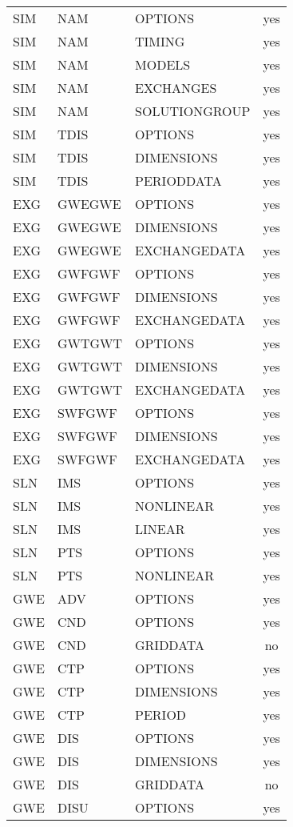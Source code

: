 \begin{longtable}{p{1.5cm} p{1.5cm} p{3cm} c}
\hline
SIM & NAM & OPTIONS & yes \\ 
SIM & NAM & TIMING & yes \\ 
SIM & NAM & MODELS & yes \\ 
SIM & NAM & EXCHANGES & yes \\ 
SIM & NAM & SOLUTIONGROUP & yes \\ 
\hline
SIM & TDIS & OPTIONS & yes \\ 
SIM & TDIS & DIMENSIONS & yes \\ 
SIM & TDIS & PERIODDATA & yes \\ 
\hline
EXG & GWEGWE & OPTIONS & yes \\ 
EXG & GWEGWE & DIMENSIONS & yes \\ 
EXG & GWEGWE & EXCHANGEDATA & yes \\ 
\hline
EXG & GWFGWF & OPTIONS & yes \\ 
EXG & GWFGWF & DIMENSIONS & yes \\ 
EXG & GWFGWF & EXCHANGEDATA & yes \\ 
\hline
EXG & GWTGWT & OPTIONS & yes \\ 
EXG & GWTGWT & DIMENSIONS & yes \\ 
EXG & GWTGWT & EXCHANGEDATA & yes \\ 
\hline
EXG & SWFGWF & OPTIONS & yes \\ 
EXG & SWFGWF & DIMENSIONS & yes \\ 
EXG & SWFGWF & EXCHANGEDATA & yes \\ 
\hline
SLN & IMS & OPTIONS & yes \\ 
SLN & IMS & NONLINEAR & yes \\ 
SLN & IMS & LINEAR & yes \\ 
\hline
SLN & PTS & OPTIONS & yes \\ 
SLN & PTS & NONLINEAR & yes \\ 
\hline
GWE & ADV & OPTIONS & yes \\ 
\hline
GWE & CND & OPTIONS & yes \\ 
GWE & CND & GRIDDATA & no \\ 
\hline
GWE & CTP & OPTIONS & yes \\ 
GWE & CTP & DIMENSIONS & yes \\ 
GWE & CTP & PERIOD & yes \\ 
\hline
GWE & DIS & OPTIONS & yes \\ 
GWE & DIS & DIMENSIONS & yes \\ 
GWE & DIS & GRIDDATA & no \\ 
\hline
GWE & DISU & OPTIONS & yes \\ 

\end{longtable}
